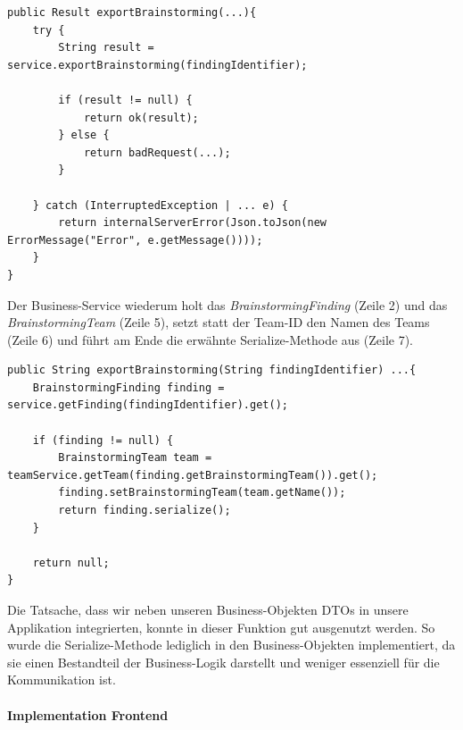 \begin{lstlisting}[caption={Export-Methode im FindingController}, label=markdownFindingController]
public Result exportBrainstorming(...){
	try {
		String result = service.exportBrainstorming(findingIdentifier);
	
	    if (result != null) {
	        return ok(result);
	    } else {
	        return badRequest(...);
	    }
	    
	} catch (InterruptedException | ... e) {
	    return internalServerError(Json.toJson(new ErrorMessage("Error", e.getMessage())));
	}
}
\end{lstlisting}

Der Business-Service wiederum holt das \textit{BrainstormingFinding} (Zeile 2) und das \textit{BrainstormingTeam} (Zeile 5), setzt statt der Team-ID den Namen des Teams (Zeile 6) und führt am Ende die erwähnte Serialize-Methode aus (Zeile 7). 

\begin{lstlisting}[caption={Export-Methode im FindingService}, label=markdownFindingService]
public String exportBrainstorming(String findingIdentifier) ...{
	BrainstormingFinding finding = service.getFinding(findingIdentifier).get();

	if (finding != null) {
	    BrainstormingTeam team = teamService.getTeam(finding.getBrainstormingTeam()).get();
	    finding.setBrainstormingTeam(team.getName());
	    return finding.serialize();
	}

	return null;
}
\end{lstlisting}

Die Tatsache, dass wir neben unseren Business-Objekten DTOs in unsere Applikation integrierten, konnte in dieser Funktion gut ausgenutzt werden. So wurde die Serialize-Methode lediglich in den Business-Objekten implementiert, da sie einen Bestandteil der Business-Logik darstellt und weniger essenziell für die Kommunikation ist.

\paragraph*{Implementation Frontend}~\\

